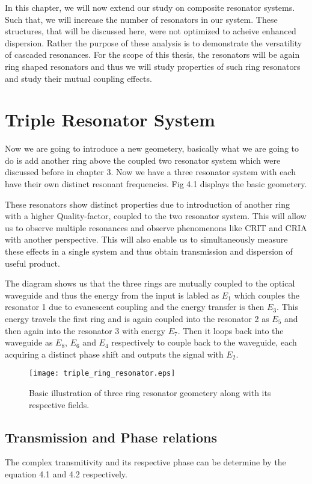 In this chapter, we will now extend our study on composite resonator systems. Such that, we will increase the number of resonators in our system. These structures, that will be discussed here, were not optimized to acheive enhanced dispersion. Rather the purpose of these analysis is to demonstrate the versatility of cascaded resonances. For the scope of this thesis, the resonators will be again ring shaped resonators and thus we will study properties of such ring resonators and study their mutual coupling effects.
\section{Triple Resonator System}
Now we are going to introduce a new geometery, basically what we are going to do is add another ring above the coupled two resonator system which were discussed before in chapter 3. Now we have a three resonator system with each have their own distinct resonant frequencies. Fig 4.1 displays the basic geometery.

These resonators show distinct properties due to introduction of another ring with a higher Quality-factor, coupled to the two resonator system. This will allow us to observe multiple resonances and observe phenomenons like CRIT and CRIA with another perspective. This will also enable us to simultaneously measure these effects in a single system and thus obtain transmission and dispersion of useful product.


The diagram shows us that the three rings are mutually coupled to the optical waveguide and thus the energy from the input is labled as $E_{1}$ which couples the resonator 1 due to evanescent coupling and the energy transfer is then $E_{3}$. This energy travels the first ring and is again coupled into the resonator 2 as $E_{5}$ and then again into the resonator 3 with energy $E_{7}$. Then it loops back into the waveguide as $E_{8}$, $E_{6}$ and $E_{4}$ respectively to couple back to the waveguide, each acquiring a distinct phase shift and outputs the signal with $E_{2}$.

\begin{figure}[h]
\centering
\texttt{[image: triple\_ring\_resonator.eps]}
\caption{Basic illustration of three ring resonator geometery along with its respective fields.}
\end{figure}

\subsection{Transmission and Phase relations}
The complex transmitivity and its respective phase can be determine by the equation 4.1 and 4.2 respectively. 

